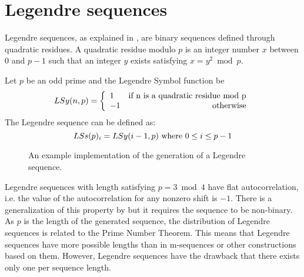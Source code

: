 \section{Legendre sequences}

Legendre sequences, as explained in \citet{legendre_sequences}, are binary
sequences defined through quadratic residues. A quadratic residue modulo $p$ is an integer number $x$ between $0$ and $p-1$ such that an integer $y$ exists satisfying $x=y^2 \bmod p$.

\begin{definition}
  Let $p$ be an odd prime and the  Legendre Symbol function  be
    \begin{equation}
      LSy(n, p) = \left\{\begin{array}{lr}
          1  & \textnormal{if n is a quadratic residue mod p}   \\
          -1 & \textnormal{otherwise} \\
      \end{array}\right.
    \end{equation}
  The Legendre sequence can be defined as:
    \begin{equation}
      LSs(p)_{i} = LSy(i-1, p) \textnormal{  where  } 0 \leq i \leq p-1
    \end{equation}
\end{definition}

\begin{figure}[ht!]
  \caption{An example implementation of the generation of a Legendre sequence.}
  \label{}
\end{figure}
 Legendre sequences with length  satisfying $p=3\bmod 4$ have flat autocorrelation, i.e.
 the value of the autocorrelation for any nonzero shift is $-1$. There is a generalization of this property by \citet{legendre_sequences}  but it requires the sequence
 to be non-binary.\\

As $p$ is the length of the generated sequence, the distribution of Legendre
sequences is related to the Prime Number Theorem\cite{manfred_prime_theorem}. This
means that Legendre sequences have more possible lengths than in m-sequences or
other constructions based on them. However, Legendre sequences have the drawback
that there exists only one per sequence length.
